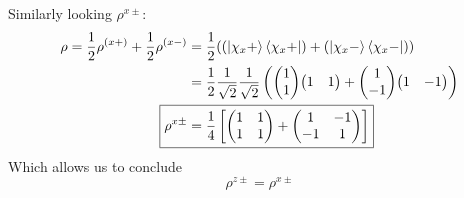\documentclass{jhwhw}
\begin{document}
Similarly looking $\rho^{x\pm}$:
\begin{align}
	\rho = \frac{1}{2}\rho^{(x+)} + \frac{1}{2}\rho^{(x-)} &= \frac{1}{2}(( \ket{\chi_x+}\bra{\chi_x+}) + (\ket{\chi_x-}\bra{\chi_x-} )) 
	\\
	&=
	\frac{1}{2}
	\frac{1}{\sqrt{2}}
	\frac{1}{\sqrt{2}}
	\left(
	{\begin{pmatrix}
		1	\\
		1
	\end{pmatrix}}
	{\begin{pmatrix}
		1	&	1
	\end{pmatrix}}
	+
	{\begin{pmatrix}
		1	\\
		-1
	\end{pmatrix}}
	{\begin{pmatrix}
		1	&	-1
	\end{pmatrix}}
	\right)
	\\
	\Aboxed{
	\rho^{x\pm}
	&=
	\frac{1}{4}
	\left[
	{\begin{pmatrix}
		1	&	1	\\
		1	&	1
	\end{pmatrix}}
	+
	{\begin{pmatrix}
		1	&	-1	\\
		-1	&	1
	\end{pmatrix}}
	\right]}
	\label{eq:pxi}
\end{align}
Which allows us to conclude
\begin{equation}
	\boxed{\rho^{z\pm} = \rho^{x\pm}}
\end{equation}
\end{document}
